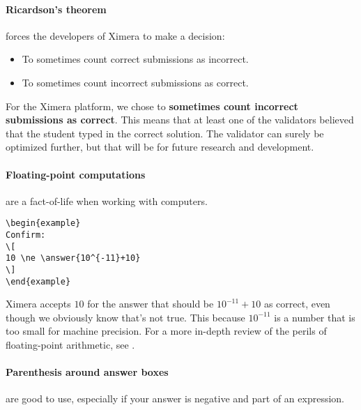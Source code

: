\documentclass{ximera}
\begin{document}
\paragraph{Ricardson's theorem} forces the developers of Ximera to make a
decision:
\begin{itemize}
  \item To sometimes count correct submissions as incorrect.
  \item To sometimes count incorrect submissions as correct.
\end{itemize}
For the Ximera platform, we chose to \textbf{sometimes count incorrect
  submissions as correct}. This means that at least one of the validators
believed that the student typed in the correct solution. The validator can
surely be optimized further, but that will be for future research and
development.

\paragraph{Floating-point computations} are a fact-of-life when working with
computers.

\begin{verbatim}
\begin{example}
Confirm:
\[
10 \ne \answer{10^{-11}+10}
\]
\end{example}
\end{verbatim}

Ximera accepts $10$ for the answer that should be $10^{-11}+10$  as correct,
even though we obviously know that's not
true.  This because $10^{-11}$ is a number that is too small for machine
precision. For a more in-depth review of the perils of floating-point
arithmetic, see .

\paragraph{Parenthesis around answer boxes} are good to use, especially if your answer is negative and part of an expression.
\end{document}
